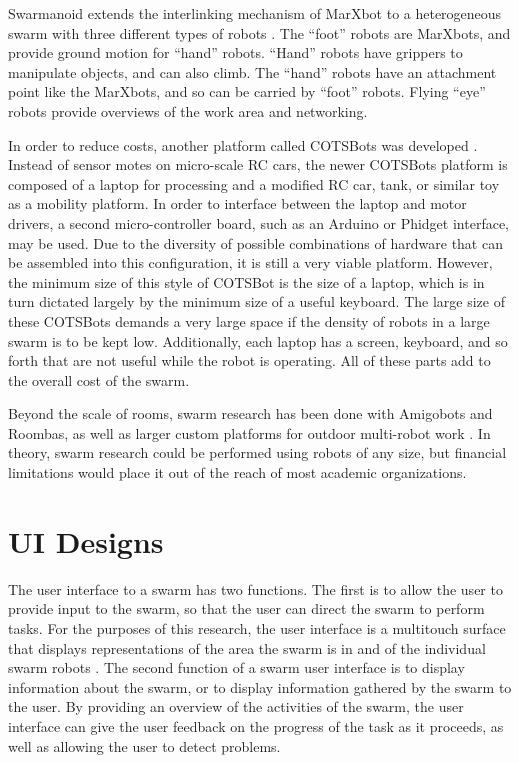 Swarmanoid extends the interlinking mechanism of MarXbot to a heterogeneous swarm with three different types of robots \citep{dorigo2013swarmanoid}.
The ``foot'' robots are MarXbots, and provide ground motion for ``hand'' robots. 
``Hand'' robots have grippers to manipulate objects, and can also climb.
The ``hand'' robots have an attachment point like the MarXbots, and so can be carried by ``foot'' robots. 
Flying ``eye'' robots provide overviews of the work area and networking.  

In order to reduce costs, another platform called COTSBots was developed \citep{soule2011cotsbots}.  
Instead of sensor motes on micro-scale RC cars, the newer COTSBots platform is composed of a laptop for processing and a modified RC car, tank, or similar toy as a mobility platform.
In order to interface between the laptop and motor drivers, a second micro-controller board, such as an Arduino or Phidget interface, may be used. 
Due to the diversity of possible combinations of hardware that can be assembled into this configuration, it is still a very viable platform. 
However, the minimum size of this style of COTSBot is the size of a laptop, which is in turn dictated largely by the minimum size of a useful keyboard. 
The large size of these COTSBots demands a very large space if the density of robots in a large swarm is to be kept low. 
Additionally, each laptop has a screen, keyboard, and so forth that are not useful while the robot is operating. 
All of these parts add to the overall cost of the swarm. 

Beyond the scale of rooms, swarm research has been done with Amigobots and Roombas, as well as larger custom platforms for outdoor multi-robot work \citep{guo2007bio, tammet2008rfid, olson2013cacm}.
In theory, swarm research could be performed using robots of any size, but financial limitations would place it out of the reach of most academic organizations. 

\section{UI Designs}

The user interface to a swarm has two functions. 
The first is to allow the user to provide input to the swarm, so that the user can direct the swarm to perform tasks. 
For the purposes of this research, the user interface is a multitouch surface that displays representations of the area the swarm is in and of the individual swarm robots \citep{micire2009multi}. 
The second function of a swarm user interface is to display information about the swarm, or to display information gathered by the swarm to the user. 
By providing an overview of the activities of the swarm, the user interface can give the user feedback on the progress of the task as it proceeds, as well as allowing the user to detect problems. 


